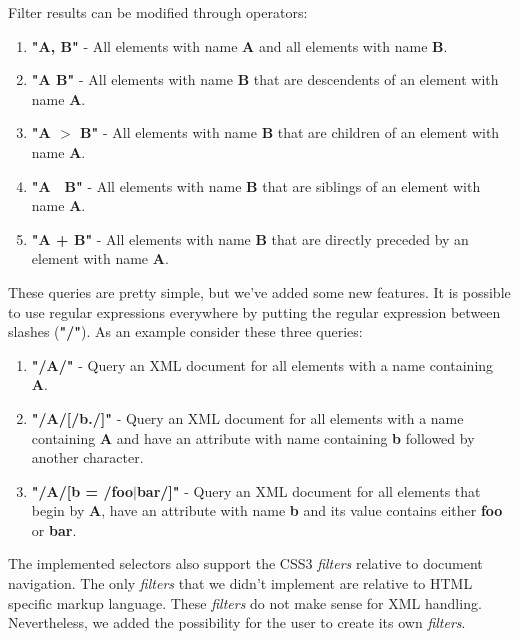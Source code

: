 \documentclass[a4paper]{report}
\begin{document}
        Filter results can be modified through operators:

            \begin{enumerate}
                \item \textbf{"A, B"} - All elements with name \textbf{A} and all elements with name \textbf{B}.\\
                \item \textbf{"A B"} - All elements with name \textbf{B} that are descendents of an element with name \textbf{A}.\\
                \item \textbf{"A $>$ B"} - All elements with name \textbf{B} that are children of an element with name \textbf{A}.\\
                \item \textbf{"A $~$ B"} - All elements with name \textbf{B} that are siblings of an element with name \textbf{A}.\\
                \item \textbf{"A + B"} - All elements with name \textbf{B} that are directly preceded by an element with name \textbf{A}.\\
            \end{enumerate}


		These queries are pretty simple, but we've added some new features. It is possible to use regular expressions everywhere by putting the regular expression between slashes (\textbf{"/"}).
		As an example consider these three queries:

			\begin{enumerate}
				\item \textbf{"/A/"} - Query an XML document for all elements with a name containing \textbf{A}.\\
				\item \textbf{"/A/[/b./]"} - Query an XML document for all elements with a name containing \textbf{A} and have an attribute with name containing \textbf{b} followed by another character.\\
				\item \textbf{"/A/[b = /foo$|$bar/]"} - Query an XML document for all elements that begin by \textbf{A}, have an attribute with name \textbf{b} and its value contains either \textbf{foo} or \textbf{bar}.\\
			\end{enumerate}

		The implemented selectors also support  the CSS3 \emph{filters} relative to document navigation. The only \emph{filters} that  we didn't implement are relative to HTML specific markup language.
		These \emph{filters} do not make sense for XML handling. Nevertheless, we added the possibility for the user to create its own \emph{filters}.
\end{document}
